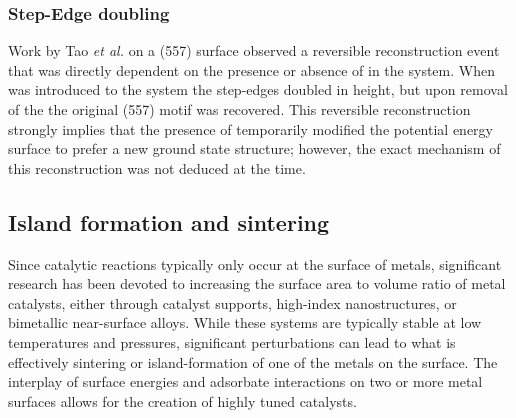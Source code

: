 \subsubsection{Step-Edge doubling}
Work by Tao {\it et al.} on a  (557) surface observed a reversible
reconstruction event that was directly dependent on the presence or absence of
 in the system.\citep{Tao:2011aa} When  was introduced to the
system the step-edges doubled in height, but upon removal of the  the original
(557) motif was recovered. This reversible reconstruction strongly implies that
the presence of  temporarily modified the potential energy surface to
prefer a new ground state structure; however, the exact mechanism of this
reconstruction was not deduced at the time. 

\subsection{Island formation and sintering}
Since catalytic reactions typically only occur at the surface of metals,
significant research has been devoted to increasing the surface area to volume
ratio of metal catalysts, either through catalyst supports, high-index
nanostructures, or bimetallic near-surface alloys. While these systems are
typically stable at low temperatures and pressures, significant perturbations
can lead to what is effectively sintering or island-formation of one of the
metals on the surface.  The interplay of surface energies and adsorbate
interactions on two or more metal surfaces allows for the creation of
highly tuned catalysts.
